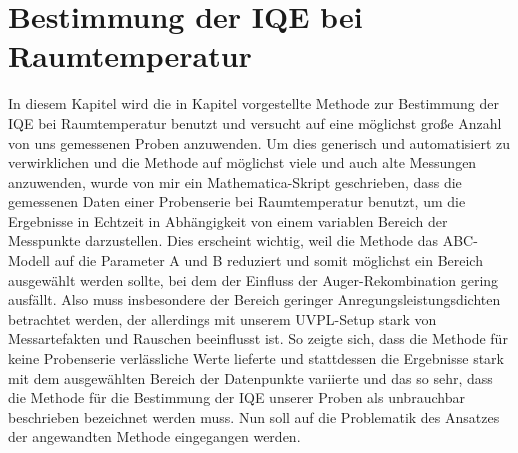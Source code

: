 \chapter{Bestimmung der IQE bei Raumtemperatur}
\thispagestyle{fancy}

In diesem Kapitel wird die in Kapitel vorgestellte Methode zur Bestimmung der IQE bei Raumtemperatur benutzt und versucht auf eine möglichst große Anzahl von uns gemessenen Proben anzuwenden. 
Um dies generisch und automatisiert zu verwirklichen und die Methode auf möglichst viele und auch alte Messungen anzuwenden, wurde von mir ein Mathematica-Skript geschrieben, dass die gemessenen Daten einer Probenserie bei Raumtemperatur benutzt, um die Ergebnisse in Echtzeit in Abhängigkeit von einem variablen Bereich der Messpunkte darzustellen. Dies erscheint wichtig, weil die Methode das ABC-Modell auf die Parameter A und B reduziert und somit möglichst ein Bereich ausgewählt werden sollte, bei dem der Einfluss der Auger-Rekombination gering ausfällt.
Also muss insbesondere der Bereich geringer Anregungsleistungsdichten betrachtet werden, der allerdings mit unserem UVPL-Setup stark von Messartefakten und Rauschen beeinflusst ist. So zeigte sich, dass die Methode für keine Probenserie verlässliche Werte lieferte und stattdessen die Ergebnisse stark mit dem ausgewählten Bereich der Datenpunkte variierte und das so sehr, dass die Methode für die Bestimmung der IQE unserer Proben als unbrauchbar beschrieben bezeichnet werden muss.
Nun soll auf die Problematik des Ansatzes der angewandten Methode eingegangen werden. 


